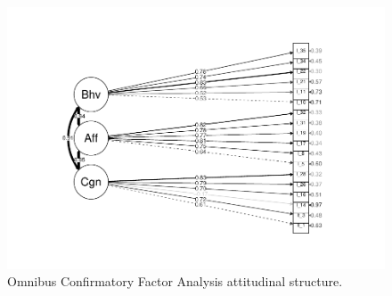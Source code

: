 \documentclass[
  man]{apa7}
\begin{document}
\begin{figure}
\centering
\includegraphics{EngagementPaper2_files/figure-latex/semplotatt-1.pdf}
\caption{\label{fig:semplotatt}Omnibus Confirmatory Factor Analysis attitudinal structure.}
\end{figure}
\end{document}

